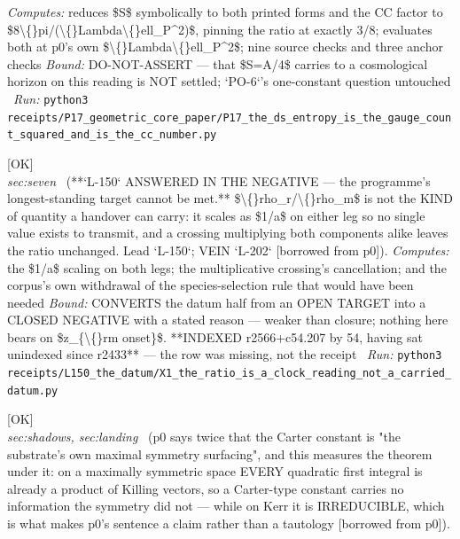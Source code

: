 \begin{description}
\emph{Computes:} reduces \$S\$ symbolically to both printed forms and the CC factor to \$8\textbackslash\{\}pi/(\textbackslash\{\}Lambda\textbackslash\{\}ell\_P\textasciicircum{}2)\$, pinning the ratio at exactly 3/8; evaluates both at p0's own \$\textbackslash\{\}Lambda\textbackslash\{\}ell\_P\textasciicircum{}2\$; nine source checks and three anchor checks
 \emph{Bound:} DO-NOT-ASSERT --- that \$S=A/4\$ carries to a cosmological horizon on this reading is NOT settled; `PO-6`'s one-constant question untouched
\ \emph{Run:} \texttt{python3 receipts/P17\_geometric\_core\_paper/P17\_the\_ds\_entropy\_is\_the\_gauge\_count\_squared\_and\_is\_the\_cc\_number.py}
\item[\label{rcpt:X1_the_ratio_is_a_clock_reading_not_a_carried_datum}\textbf{}\quad\texttt{X1\_the\_ratio\_is\_a\_clock\_reading\_not\_a\_carried\_datum}]\hfill\textsf{[OK]}\\
\textit{sec:seven} \ (**`L-150` ANSWERED IN THE NEGATIVE --- the programme's longest-standing target cannot be met.** \$\textbackslash\{\}rho\_r/\textbackslash\{\}rho\_m\$ is not the KIND of quantity a handover can carry: it scales as \$1/a\$ on either leg so no single value exists to transmit, and a crossing multiplying both components alike leaves the ratio unchanged. Lead `L-150`; VEIN `L-202` [borrowed from p0]). 
\emph{Computes:} the \$1/a\$ scaling on both legs; the multiplicative crossing's cancellation; and the corpus's own withdrawal of the species-selection rule that would have been needed
 \emph{Bound:} CONVERTS the datum half from an OPEN TARGET into a CLOSED NEGATIVE with a stated reason --- weaker than closure; nothing here bears on \$z\_\{\textbackslash\{\}rm onset\}\$.  **INDEXED r2566+c54.207 by 54, having sat unindexed since r2433** --- the row was missing, not the receipt
\ \emph{Run:} \texttt{python3 receipts/L150\_the\_datum/X1\_the\_ratio\_is\_a\_clock\_reading\_not\_a\_carried\_datum.py}
\item[\label{rcpt:I50_the_carter_constant_is_the_substrates_symmetry_and_kerrs_is_not}\textbf{}\quad\texttt{I50\_the\_carter\_constant\_is\_the\_substrates\_symmetry\_and\_kerrs\_is\_not}]\hfill\textsf{[OK]}\\
\textit{sec:shadows, sec:landing} \ (p0 says twice that the Carter constant is "the substrate's own maximal symmetry surfacing", and this measures the theorem under it: on a maximally symmetric space EVERY quadratic first integral is already a product of Killing vectors, so a Carter-type constant carries no information the symmetry did not --- while on Kerr it is IRREDUCIBLE, which is what makes p0's sentence a claim rather than a tautology [borrowed from p0]). 

\end{description}
